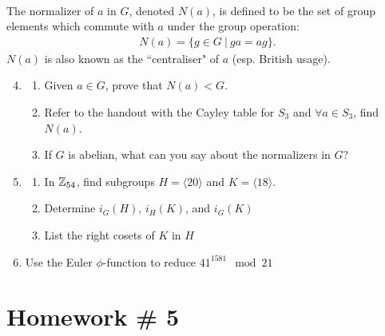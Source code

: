 \begin{definition}\hspace{0.1in} \\
The normalizer of $a$ in $G$, denoted $N(a)$, is defined to be the set of group elements which commute with $a$ under the group operation:
\begin{align}
    N(a)=\{g\in G \ | \ ga=ag\}. \nonumber
\end{align}
$N(a)$ is also known as the ``centraliser" of $a$ (esp. British usage).
\end{definition}
\vspace{0.1in}
\begin{enumerate}
\setcounter{enumi}{3}
    \item \begin{enumerate}[label=\alph*)]
        \item Given $a\in G$, prove that $N(a)<G$.
        \item Refer to the handout with the Cayley table for $S_3$ and $\forall a \in S_3$, find $N(a)$.
        \item If $G$ is abelian, what can you say about the normalizers in $G$? \\ \steezybreak
        
    \end{enumerate}
    \item \begin{enumerate}[label=\alph*)]
        \item In ${\mathbb{ Z}}_{54}$, find subgroups $H=\langle 20 \rangle$ and $K= \langle 18 \rangle$.
        \item Determine $i_G(H)$, $i_H(K)$, and $i_G(K)$
        \item List the right cosets of $K$ in $H$ \\ \steezybreak
    \end{enumerate}
    \item Use the Euler $\phi$-function to reduce $41^{1581}\mod 21$
\end{enumerate}
\newpage
\section{Homework \# 5}
\label{sec:HW5}

